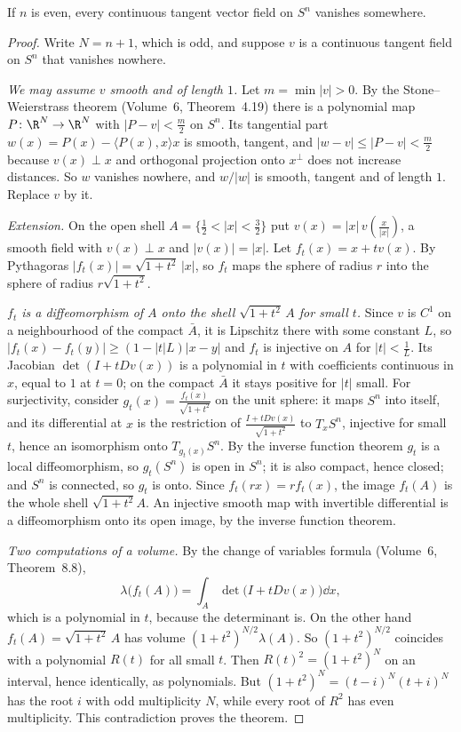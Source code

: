 \begin{theorem}\label{thm:hairyball}
If $n$ is even, every continuous tangent vector field on $S^n$ vanishes somewhere.
\end{theorem}
\begin{proof}
Write $N=n+1$, which is odd, and suppose $v$ is a continuous tangent field on $S^n$ that vanishes nowhere.

\emph{We may assume $v$ smooth and of length $1$.} Let $m=\min|v|>0$. By the Stone--Weierstrass theorem (Volume~6, Theorem~4.19) there is a polynomial map
$P\colon\R^N\to\R^N$ with $|P-v|<\frac m2$ on $S^n$. Its tangential part $w(x)=P(x)-\langle P(x),x\rangle x$ is smooth, tangent, and $|w-v|\le|P-v|<\frac m2$
because $v(x)\perp x$ and orthogonal projection onto $x^\perp$ does not increase distances. So $w$ vanishes nowhere, and $w/|w|$ is smooth, tangent and of
length $1$. Replace $v$ by it.

\emph{Extension.} On the open shell $A=\{\frac12<|x|<\frac32\}$ put $v(x)=|x|\,v(\frac x{|x|})$, a smooth field with $v(x)\perp x$ and $|v(x)|=|x|$. Let
$f_t(x)=x+tv(x)$. By Pythagoras $|f_t(x)|=\sqrt{1+t^2}\,|x|$, so $f_t$ maps the sphere of radius $r$ into the sphere of radius $r\sqrt{1+t^2}$.

\emph{$f_t$ is a diffeomorphism of $A$ onto the shell $\sqrt{1+t^2}\,A$ for small $t$.} Since $v$ is $C^1$ on a neighbourhood of the compact $\bar A$, it is
Lipschitz there with some constant $L$, so $|f_t(x)-f_t(y)|\ge(1-|t|L)|x-y|$ and $f_t$ is injective on $A$ for $|t|<\frac1L$. Its Jacobian $\det(I+tDv(x))$ is a
polynomial in $t$ with coefficients continuous in $x$, equal to $1$ at $t=0$; on the compact $\bar A$ it stays positive for $|t|$ small. For surjectivity,
consider $g_t(x)=\frac{f_t(x)}{\sqrt{1+t^2}}$ on the unit sphere: it maps $S^n$ into itself, and its differential at $x$ is the restriction of
$\frac{I+tDv(x)}{\sqrt{1+t^2}}$ to $T_xS^n$, injective for small $t$, hence an isomorphism onto $T_{g_t(x)}S^n$. By the inverse function theorem $g_t$ is a
local diffeomorphism, so $g_t(S^n)$ is open in $S^n$; it is also compact, hence closed; and $S^n$ is connected, so $g_t$ is onto. Since $f_t(rx)=rf_t(x)$, the
image $f_t(A)$ is the whole shell $\sqrt{1+t^2}A$. An injective smooth map with invertible differential is a diffeomorphism onto its open image, by the
inverse function theorem.

\emph{Two computations of a volume.} By the change of variables formula (Volume~6, Theorem~8.8),
\[
\lambda\bigl(f_t(A)\bigr)=\int_A\det\bigl(I+tDv(x)\bigr)\dd x,
\]
which is a polynomial in $t$, because the determinant is. On the other hand $f_t(A)=\sqrt{1+t^2}\,A$ has volume $(1+t^2)^{N/2}\lambda(A)$. So
$(1+t^2)^{N/2}$ coincides with a polynomial $R(t)$ for all small $t$. Then $R(t)^2=(1+t^2)^N$ on an interval, hence identically, as polynomials. But
$(1+t^2)^N=(t-i)^N(t+i)^N$ has the root $i$ with odd multiplicity $N$, while every root of $R^2$ has even multiplicity. This contradiction proves the theorem.
\end{proof}

